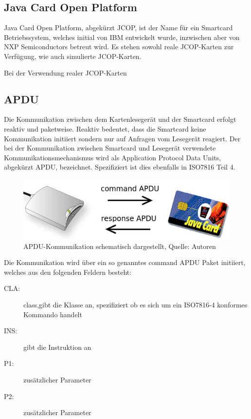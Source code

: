 \documentclass[a4paper,12pt]{scrartcl}
\begin{document}
\subsection{Java Card Open Platform}
\label{subsec:2.2}
Java Card Open Platform, abgekürzt JCOP, ist der Name für ein Smartcard Betriebssystem, welches initial von IBM entwickelt wurde, inzwischen aber von NXP Semiconductors betreut wird. 
Es stehen sowohl reale JCOP-Karten zur Verfügung, wie auch simulierte JCOP-Karten.

Bei der Verwendung realer JCOP-Karten 

\subsection{APDU}
\label{subsec:2.3}

Die Kommunikation zwischen dem Kartenlesegerät und der Smartcard erfolgt reaktiv und paketweise. Reaktiv bedeutet, dass die Smartcard keine Kommunikation initiiert sondern nur auf Anfragen vom Lesegerät reagiert. Der bei der Kommunikation zwischen Smartcard und Lesegerät verwendete Kommunikationsmechanismus wird als Application Protocol Data Units, abgekürzt APDU, bezeichnet. Spezifiziert ist dies ebenfalls in ISO7816 Teil 4.\cite{iso7816}
\\

\begin{figure}[htb]
\begin{center}
 \includegraphics[width=1\hsize]{./images/apdu.png}
\end{center}
\caption[APDU-Kommunikation schematisch dargestellt, Quelle: Autoren]{\label{apdu}APDU-Kommunikation schematisch dargestellt, Quelle: Autoren}
\end{figure}

Die Kommunikation wird über ein so genanntes command APDU Paket initiiert, welches aus den folgenden Feldern besteht:

\begin{description}
\item[CLA:] class,gibt die Klasse an, spezifiziert ob es sich um ein ISO7816-4 konformes Kommando handelt
\item[INS:] gibt die Instruktion an
\item[P1:] zusätzlicher Parameter
\item[P2:] zusätzlicher Parameter
\end{description} 
\end{document}

